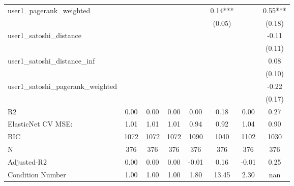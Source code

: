\begin{table}
\begin{center}
\begin{tabular}{lccccccc}
user1_pagerank_weighted                        &          &            &         &         & 0.14***  &                    & 0.55***  \\
                                               &          &            &         &         & (0.05)   &                    & (0.18)   \\
user1_satoshi_distance                         &          &            &         &         &          &                    & -0.11    \\
                                               &          &            &         &         &          &                    & (0.11)   \\
user1_satoshi_distance_inf                     &          &            &         &         &          &                    & 0.08     \\
                                               &          &            &         &         &          &                    & (0.10)   \\
user1_satoshi_pagerank_weighted                &          &            &         &         &          &                    & -0.22    \\
                                               &          &            &         &         &          &                    & (0.17)   \\
R2                                             & 0.00     & 0.00       & 0.00    & 0.00    & 0.18     & 0.00               & 0.27     \\
ElasticNet CV MSE:                             & 1.01     & 1.01       & 1.01    & 0.94    & 0.92     & 1.04               & 0.90     \\
BIC                                            & 1072     & 1072       & 1072    & 1090    & 1040     & 1102               & 1030     \\
N                                              & 376      & 376        & 376     & 376     & 376      & 376                & 376      \\
Adjusted-R2                                    & 0.00     & 0.00       & 0.00    & -0.01   & 0.16     & -0.01              & 0.25     \\
Condition Number                               & 1.00     & 1.00       & 1.00    & 1.80    & 13.45    & 2.30               & nan      \\
\hline
\end{tabular}
\end{center}
\end{table}
